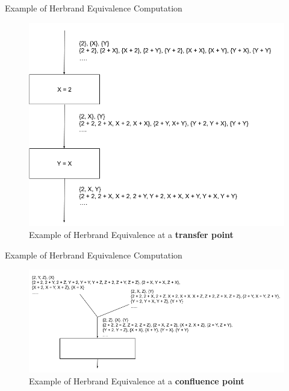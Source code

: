\documentclass[11pt]{beamer}
\begin{document}
\begin{frame}{Example of Herbrand Equivalence Computation}
    \begin{figure}[!h]
        \centering
        \includegraphics[scale=0.3]{HerbrandEquivalenceTrans.png}
        \caption{Example of Herbrand Equivalence at a \textbf{transfer point}}
        \label{fig:HerbrandEquivalenceTrans}
    \end{figure}
\end{frame}

\begin{frame}{Example of Herbrand Equivalence Computation}
    \begin{figure}[!h]
        \centering
        \includegraphics[scale=0.4]{HerbrandEquivalenceConv.png}
        \caption{Example of Herbrand Equivalence at a \textbf{confluence point}}
        \label{fig:HerbrandEquivalenceCon}
    \end{figure}
\end{frame}
\end{document}
